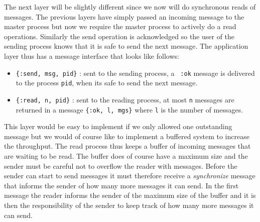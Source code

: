 \documentclass[a4paper,11pt]{article}
\begin{document}
The next layer will be slightly different since we now will do
synchronous reads of messages. The previous layers have simply passed
an incoming message to the master process but now we require the
master process to actively do a read operations. Similarly the send
operation is acknowledged so the user of the sending process knows
that it is safe to send the next message. The application layer thus
has a message interface that looks like follows:

\begin{itemize}
\item {\tt \{:send, msg, pid\}} : sent to the sending process, a {\tt
    :ok} message is delivered to the process {\tt pid}, when its safe
  to send the next message.

\item {\tt \{:read, n, pid\}} : sent to the reading process, at most
  {\tt n} messages are returned in a message {\tt \{:ok, l, mgs\}}
  where {\tt l} is the number of messages.
\end{itemize}

This layer would be easy to implement if we only allowed one
outstanding message but we would of course like to implement a
buffered system to increase the throughput. The read process thus keeps
a buffer of incoming messages that are waiting to be read. The buffer
does of course have a maximum size and the sender must be careful not
to overflow the reader with messages. Before the sender can start to
send messages it must therefore receive a {\em synchronize} message
that informs the sender of how many more messages it can send. In the
first message the reader informs the sender of the maximum size of the
buffer and it is then the responsibility of the sender to keep track of
how many more messages it can send.
\end{document}
